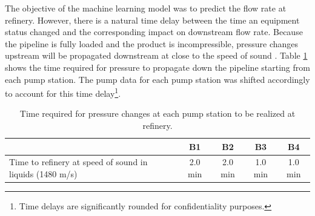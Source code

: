 The objective of the machine learning model was to predict the flow rate at refinery.  However, there is a natural time delay between the time an equipment status changed and the corresponding impact on downstream flow rate.  Because the pipeline is fully loaded and the product is incompressible, pressure changes upstream will be propagated downstream at close to the speed of sound \cite{fluid_mechanics}.  Table \ref{tab:08TimeToCC} shows the time required for pressure to propagate down the pipeline starting from each pump station.  The pump data for each pump station was shifted accordingly to account for this time delay\footnote{Time delays are significantly rounded for confidentiality purposes.}.  
\begin{table}[h]
    \centering
    {
    \begin{tabular}{ p{6cm} | c | c | c | c}
             & B1 & B2 & B3 & B4 \\
        \hline
        Time to refinery at speed of sound in liquids (1480 m/s) \cite{fluid_mechanics}
        &  2.0 min  &  2.0 min  &  1.0 min  &  1.0 min  \\
    \end{tabular}}
    \caption{Time required for pressure changes at each pump station to be realized at refinery.}
    \label{tab:08TimeToCC}
\end{table}
